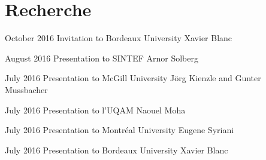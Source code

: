 \section{Recherche}

\begin{yearlist}
      
\item{October 2016}
     {Invitation to Bordeaux University}
     {Xavier Blanc}
      
\item{August 2016}
     {Presentation to SINTEF}
     {Arnor Solberg}

\item{July 2016}
     {Presentation to McGill University}
     {J\"org Kienzle and Gunter Mussbacher}

\item{July 2016}
     {Presentation to l'UQAM}
     {Naouel Moha}

\item{July 2016}
     {Presentation to  Montr\'eal University}
     {Eugene Syriani}
     
\item{July 2016}
     {Presentation to Bordeaux University}
     {Xavier Blanc}     

\end{yearlist}